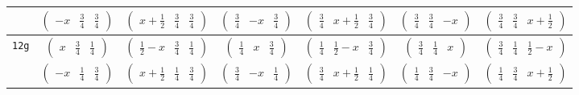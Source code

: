 \documentclass[fleqn,9pt,landscape]{jsarticle}
\begin{document}
\begin{center}
\begin{longtable}{ccccccc}
& $ \begin{pmatrix} - x & \frac{3}{4} & \frac{3}{4} \end{pmatrix} $ & $ \begin{pmatrix} x + \frac{1}{2} & \frac{3}{4} & \frac{3}{4} \end{pmatrix} $ & $ \begin{pmatrix} \frac{3}{4} & - x & \frac{3}{4} \end{pmatrix} $ & $ \begin{pmatrix} \frac{3}{4} & x + \frac{1}{2} & \frac{3}{4} \end{pmatrix} $ & $ \begin{pmatrix} \frac{3}{4} & \frac{3}{4} & - x \end{pmatrix} $ & $ \begin{pmatrix} \frac{3}{4} & \frac{3}{4} & x + \frac{1}{2} \end{pmatrix} $ \\ \hline
{\tt 12g} & $ \begin{pmatrix} x & \frac{3}{4} & \frac{1}{4} \end{pmatrix} $ & $ \begin{pmatrix} \frac{1}{2} - x & \frac{3}{4} & \frac{1}{4} \end{pmatrix} $ & $ \begin{pmatrix} \frac{1}{4} & x & \frac{3}{4} \end{pmatrix} $ & $ \begin{pmatrix} \frac{1}{4} & \frac{1}{2} - x & \frac{3}{4} \end{pmatrix} $ & $ \begin{pmatrix} \frac{3}{4} & \frac{1}{4} & x \end{pmatrix} $ & $ \begin{pmatrix} \frac{3}{4} & \frac{1}{4} & \frac{1}{2} - x \end{pmatrix} $ \\
& $ \begin{pmatrix} - x & \frac{1}{4} & \frac{3}{4} \end{pmatrix} $ & $ \begin{pmatrix} x + \frac{1}{2} & \frac{1}{4} & \frac{3}{4} \end{pmatrix} $ & $ \begin{pmatrix} \frac{3}{4} & - x & \frac{1}{4} \end{pmatrix} $ & $ \begin{pmatrix} \frac{3}{4} & x + \frac{1}{2} & \frac{1}{4} \end{pmatrix} $ & $ \begin{pmatrix} \frac{1}{4} & \frac{3}{4} & - x \end{pmatrix} $ & $ \begin{pmatrix} \frac{1}{4} & \frac{3}{4} & x + \frac{1}{2} \end{pmatrix} $ \\ \hline

\end{longtable}
\end{center}
\end{document}
